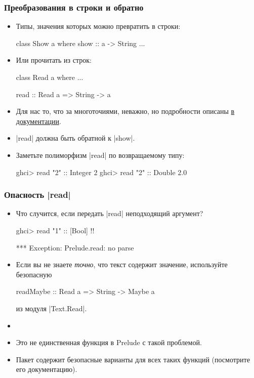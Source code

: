 \documentclass[10pt]{beamer}
\begin{document}
\begin{frame}[fragile]
  \frametitle{Преобразования в строки и обратно}
  \begin{itemize}
    \item
          Типы, значения которых можно превратить в строки:
          \begin{haskell}
            class Show a where
                show :: a -> String 
                ...
          \end{haskell}
          \pause
    \item Или прочитать из строк:
          \begin{haskell}
            class Read a where ...

            read :: Read a => String -> a
          \end{haskell}
          \pause
    \item Для нас то, что за многоточиями, неважно, но подробности описаны \href{https://hackage.haskell.org/package/base/docs/Prelude.html#g:22}{в документации}.\pause
    \item \haskinline|read| должна быть обратной к \haskinline|show|.
    \item Заметьте полиморфизм \haskinline|read| по возвращаемому типу:
          \begin{haskell}
            ghci> read "2" :: Integer
            2
            ghci> read "2" :: Double
            2.0
          \end{haskell}
  \end{itemize}
\end{frame}

\begin{frame}[fragile]
  \frametitle{Опасность \haskinline|read|}
  \begin{itemize}
    \item Что случится, если передать \haskinline|read| неподходящий аргумент?
          \begin{haskell}
            ghci> read "1" :: [Bool] !\pause!
          \end{haskell}
          \begin{ghci}
            *** Exception: Prelude.read: no parse
          \end{ghci}
    \item Если вы не знаете \emph{точно}, что текст содержит значение, используйте безопасную
          \begin{haskell}
            readMaybe :: Read a => String -> Maybe a
          \end{haskell}
          из модуля \haskinline|Text.Read|.
          \pause
    \item[]
    \item Это не единственная функция в Prelude с такой проблемой.
    \item Пакет  содержит безопасные варианты для всех таких функций (посмотрите его документацию).
  \end{itemize}
\end{frame}
\end{document}
